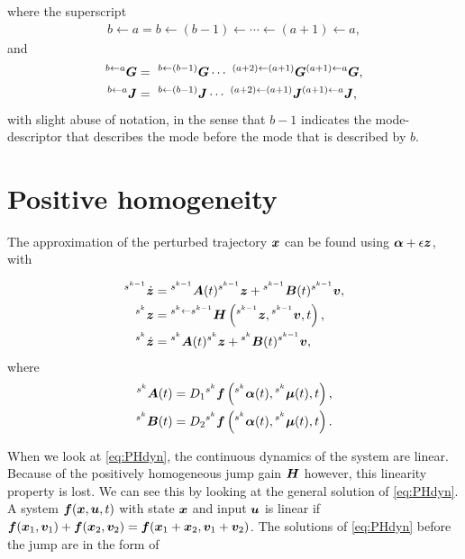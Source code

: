 \documentclass[../DC2019003Bouma.tex]{subfiles}
\begin{document}
where the superscript
\begin{align}
b\leftarrow a =b\leftarrow (b-1) \leftarrow \cdots \leftarrow (a+1) \leftarrow a,
\end{align}
and
\begin{align}
^{b\leftarrow a}\Gb &=\ ^{b\leftarrow (b-1)}\Gb\cdots\ ^{(a+2)\leftarrow (a+1)}\Gb^{(a+1)\leftarrow a}\Gb,\\
^{b\leftarrow a}\Jb &=\ ^{b\leftarrow (b-1)}\Jb\cdots\ ^{(a+2)\leftarrow (a+1)}\Jb^{(a+1)\leftarrow a}\Jb,
\end{align}
with slight abuse of notation, in the sense that $b-1$ indicates the mode-descriptor that describes the mode before the mode that is described by $b$.

\section{Positive homogeneity}\label{app:poshom}
The approximation of the perturbed trajectory ${\boldsymbol{x}}$ can be found using $\boldsymbol{\alpha} + \epsilon{\boldsymbol{z}}$, with

\begin{align}
\hspace{0cm}^{s^{k-1}}\dot{{\boldsymbol{z}}} &=\hspace{0cm}^{s^{k-1}}{\boldsymbol{A}}(t)\hspace{0cm}^{s^{k-1}}{\boldsymbol{z}} +\hspace{0cm}^{s^{k-1}}{\boldsymbol{B}}(t)\hspace{0cm}^{s^{k-1}}{\boldsymbol{v}},\nonumber\\
\hspace{0cm}^{s^{k}}{\boldsymbol{z}} &= \hspace{0cm}^{s^{k}\leftarrow s^{k-1}}{\boldsymbol{H}}\left(\hspace{0cm}^{s^{k-1}}{\boldsymbol{z}},\hspace{0cm}^{s^{k-1}}{\boldsymbol{v}},t\right),\label{eq:PHdyn}\\
\hspace{0cm}^{s^{k}}\dot{{\boldsymbol{z}}} &=\hspace{0cm}^{s^{k}}{\boldsymbol{A}}(t)\hspace{0cm}^{s^{k}}{\boldsymbol{z}} +\hspace{0cm}^{s^{k}}{\boldsymbol{B}}(t)\hspace{0cm}^{s^{k-1}}{\boldsymbol{v}},\nonumber
\end{align}
where
\begin{align}
^{s^{k}}{\boldsymbol{A}}(t) &= D_1\hspace{0cm}^{s^{k}}{\boldsymbol{f}}\left(\hspace{0cm}^{s^{k}}\boldsymbol{\alpha}(t),\hspace{0cm}^{s^{k}}\boldsymbol{\mu}(t),t\right),\\
^{s^{k}}{\boldsymbol{B}}(t) &= D_2\hspace{0cm}^{s^{k}}{\boldsymbol{f}}\left(\hspace{0cm}^{s^{k}}\boldsymbol{\alpha}(t),\hspace{0cm}^{s^{k}}\boldsymbol{\mu}(t),t\right).
\end{align}

When we look at \eqref{eq:PHdyn}, the continuous dynamics of the system are linear. Because of the positively homogeneous jump gain ${\boldsymbol{H}}$ however, this linearity property is lost. We can see this by looking at the general solution of \eqref{eq:PHdyn}. A system ${\boldsymbol{f}}({\boldsymbol{x}},{\boldsymbol{u}},t)$ with state ${\boldsymbol{x}}$ and input ${\boldsymbol{u}}$ is linear if ${\boldsymbol{f}}({\boldsymbol{x}}_1,{\boldsymbol{v}}_1) + {\boldsymbol{f}}({\boldsymbol{x}}_2,{\boldsymbol{v}}_2) = {\boldsymbol{f}}({\boldsymbol{x}}_1+{\boldsymbol{x}}_2,{\boldsymbol{v}}_1+{\boldsymbol{v}}_2)$. The solutions of \eqref{eq:PHdyn} before the jump are in the form of
\end{document}
